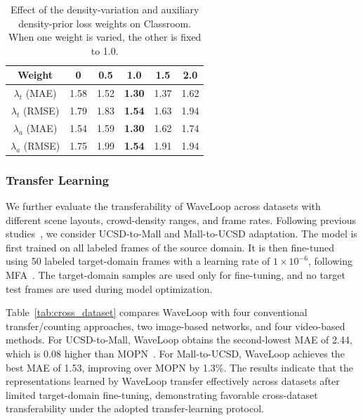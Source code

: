 \documentclass[lettersize,journal]{IEEEtran}
\begin{document}
\begin{table}[t]
\centering
\caption{Effect of the density-variation and auxiliary density-prior loss weights on Classroom. When one weight is varied, the other is fixed to 1.0.}
\scriptsize
\begin{tabular}{cccccc}
\toprule
Weight & 0 & 0.5 & 1.0 & 1.5 & 2.0 \\
\midrule
$\lambda_t$ (MAE)  & 1.58 & 1.52 & \textbf{1.30} & 1.37 & 1.62 \\
$\lambda_t$ (RMSE) & 1.79 & 1.83 & \textbf{1.54} & 1.63 & 1.94 \\
\midrule
$\lambda_a$ (MAE)  & 1.54 & 1.59 & \textbf{1.30} & 1.62 & 1.74 \\
$\lambda_a$ (RMSE) & 1.75 & 1.99 & \textbf{1.54} & 1.91 & 1.94 \\
\bottomrule
\end{tabular}
\label{tab:loss_weights}
\end{table}

\subsubsection{Transfer Learning}
We further evaluate the transferability of WaveLoop across datasets with different scene layouts, crowd-density ranges, and frame rates. Following previous studies~\cite{xiong2017spatiotemporal,ling2023motional,ling2025dual}, we consider UCSD-to-Mall and Mall-to-UCSD adaptation. The model is first trained on all labeled frames of the source domain. It is then fine-tuned using 50 labeled target-domain frames with a learning rate of $1\times10^{-6}$, following MFA~\cite{ling2023motional}. The target-domain samples are used only for fine-tuning, and no target test frames are used during model optimization.

Table~\ref{tab:cross_dataset} compares WaveLoop with four conventional transfer/counting approaches, two image-based networks, and four video-based methods. For UCSD-to-Mall, WaveLoop obtains the second-lowest MAE of 2.44, which is 0.08 higher than MOPN~\cite{hossain2020video}. For Mall-to-UCSD, WaveLoop achieves the best MAE of 1.53, improving over MOPN by 1.3\%. The results indicate that the representations learned by WaveLoop transfer effectively across datasets after limited target-domain fine-tuning, demonstrating favorable cross-dataset transferability under the adopted transfer-learning protocol.
\end{document}

